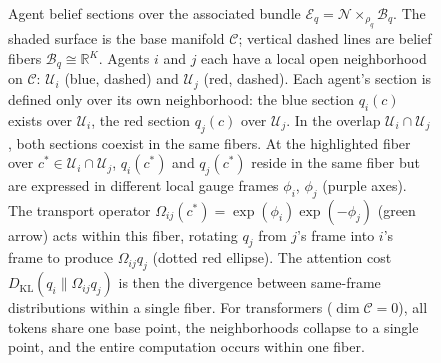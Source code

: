 \documentclass[twoside,11pt]{article}
\newcommand{\KL}{\operatorname{KL}}
\begin{document}
\begin{figure}[t]
\caption{%
Agent belief sections over the associated bundle
$\mathcal{E}_q = \mathcal{N} \times_{\rho_q} \mathcal{B}_q$.
The shaded surface is the base manifold $\mathcal{C}$;
vertical dashed lines are belief fibers $\mathcal{B}_q \cong \mathbb{R}^K$.
Agents $i$ and $j$ each have a local open neighborhood on $\mathcal{C}$:
$\mathcal{U}_i$ (blue, dashed) and $\mathcal{U}_j$ (red, dashed).
Each agent's section is defined only over its own neighborhood:
the blue section $q_i(c)$ exists over $\mathcal{U}_i$,
the red section $q_j(c)$ over $\mathcal{U}_j$.
In the overlap $\mathcal{U}_i \cap \mathcal{U}_j$,
both sections coexist in the same fibers.
At the highlighted fiber over $c^* \in \mathcal{U}_i \cap \mathcal{U}_j$,
$q_i(c^*)$ and $q_j(c^*)$ reside in the same fiber
but are expressed in different local gauge frames
$\phi_i$, $\phi_j$ (purple axes).
The transport operator
$\Omega_{ij}(c^*) = \exp(\phi_i)\exp(-\phi_j)$
(green arrow) acts within this fiber,
rotating $q_j$ from $j$'s frame into $i$'s frame
to produce $\Omega_{ij} q_j$ (dotted red ellipse).
The attention cost $D_{\mathrm{KL}}(q_i \| \Omega_{ij} q_j)$
is then the divergence between same-frame distributions within a single fiber.
For transformers ($\dim\mathcal{C} = 0$),
all tokens share one base point, the neighborhoods collapse to a single point,
and the entire computation occurs within one fiber.
}
\label{fig:bundle_sections_surface}
\end{figure}
\end{document}
